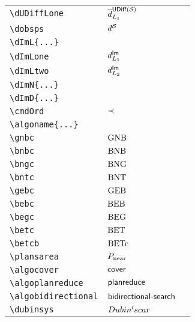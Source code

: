 \begin{longtable}{lll}
 {\color[rgb]{0.5,0.5,0.5}\texttt{\textbackslash dUDiffLone}} & $\dUDiffLone$ & \\ 
 {\color[rgb]{0.5,0.5,0.5}\texttt{\textbackslash dobsps}} & $\dobsps$ & \\ 
 {\color[rgb]{0.5,0.5,0.5}\texttt{\textbackslash dImL\{...\}}} &  & \\ 
 {\color[rgb]{0.5,0.5,0.5}\texttt{\textbackslash dImLone}} & $d^{\mathsf{Im}}_{L_{1}}$ & \\ 
 {\color[rgb]{0.5,0.5,0.5}\texttt{\textbackslash dImLtwo}} & $d^{\mathsf{Im}}_{L_{2}}$ & \\ 
 {\color[rgb]{0.5,0.5,0.5}\texttt{\textbackslash dImN\{...\}}} &  & \\ 
 {\color[rgb]{0.5,0.5,0.5}\texttt{\textbackslash dImD\{...\}}} &  & \\ 
 {\color[rgb]{0.5,0.5,0.5}\texttt{\textbackslash cmdOrd}} & $\prec$ & \\ 
 {\color[rgb]{0.5,0.5,0.5}\texttt{\textbackslash algoname\{...\}}} &  & \\ 
 {\color[rgb]{0.5,0.5,0.5}\texttt{\textbackslash gnbc}} & $\text{GNB}$ & \\ 
 {\color[rgb]{0.5,0.5,0.5}\texttt{\textbackslash bnbc}} & $\text{BNB}$ & \\ 
 {\color[rgb]{0.5,0.5,0.5}\texttt{\textbackslash bngc}} & $\text{BNG}$ & \\ 
 {\color[rgb]{0.5,0.5,0.5}\texttt{\textbackslash bntc}} & $\text{BNT}$ & \\ 
 {\color[rgb]{0.5,0.5,0.5}\texttt{\textbackslash gebc}} & $\text{GEB}$ & \\ 
 {\color[rgb]{0.5,0.5,0.5}\texttt{\textbackslash bebc}} & $\text{BEB}$ & \\ 
 {\color[rgb]{0.5,0.5,0.5}\texttt{\textbackslash begc}} & $\text{BEG}$ & \\ 
 {\color[rgb]{0.5,0.5,0.5}\texttt{\textbackslash betc}} & $\text{BET}$ & \\ 
 {\color[rgb]{0.5,0.5,0.5}\texttt{\textbackslash betcb}} & $\text{BETc}$ & \\ 
 {\color[rgb]{0.5,0.5,0.5}\texttt{\textbackslash plansarea}} & $P_{\text{near}}$ & \\ 
 {\color[rgb]{0.5,0.5,0.5}\texttt{\textbackslash algocover}} & $\textsf{cover}$ & \\ 
 {\color[rgb]{0.5,0.5,0.5}\texttt{\textbackslash algoplanreduce}} & $\textsf{planreduce}$ & \\ 
 {\color[rgb]{0.5,0.5,0.5}\texttt{\textbackslash algobidirectional}} & $\textsf{bidirectional-search}$ & \\ 
 {\color[rgb]{0.5,0.5,0.5}\texttt{\textbackslash dubinsys}} & $Dubin's car$ & \\ 

\end{longtable}
